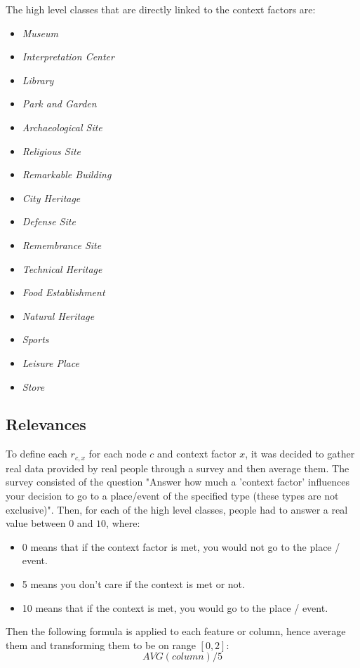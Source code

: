 The high level classes that are directly linked to the context factors are:
\begin{itemize}
    \item \textit{Museum}
    \item \textit{Interpretation Center}
    \item \textit{Library}
    \item \textit{Park and Garden}
    \item \textit{Archaeological Site}
    \item \textit{Religious Site}
    \item \textit{Remarkable Building}
    \item \textit{City Heritage}
    \item \textit{Defense Site}
    \item \textit{Remembrance Site}
    \item \textit{Technical Heritage}
    \item \textit{Food Establishment}
    \item \textit{Natural Heritage}
    \item \textit{Sports}
    \item \textit{Leisure Place}
    \item \textit{Store}
\end{itemize}

\subsection{Relevances} \label{section:relevances-survey}
To define each $r_{c,x}$ for each node $c$ and context factor $x$, it was decided to gather real data provided by real people through a survey and then average them. The survey consisted of the question "Answer how much a 'context factor' influences your decision to go to a place/event of the specified type (these types are not exclusive)". Then, for each of the high level classes, people had to answer a real value between $0$ and $10$, where:
\begin{itemize}
    \item $0$ means that if the context factor is met, you would not go to the place / event.
    \item 5 means you don't care if the context is met or not.
    \item 10 means that if the context is met, you would go to the place / event.
\end{itemize}

Then the following formula is applied to each feature or column, hence average them and transforming them to be on range $[0,2]$:
$$AVG(column)/5$$

